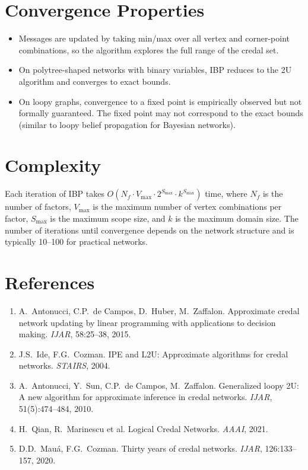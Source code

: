 \documentclass[11pt]{article}
\begin{document}
\section{Convergence Properties}

\begin{itemize}
  \item Messages are updated by taking min/max over all vertex and corner-point
        combinations, so the algorithm explores the full range of the credal set.
  \item On polytree-shaped networks with binary variables, IBP reduces to the
        2U algorithm and converges to exact bounds.
  \item On loopy graphs, convergence to a fixed point is empirically observed
        but not formally guaranteed. The fixed point may not correspond to the
        exact bounds (similar to loopy belief propagation for Bayesian networks).
\end{itemize}

\section{Complexity}

Each iteration of IBP takes $O(N_f \cdot V_{\max} \cdot 2^{S_{\max}} \cdot k^{S_{\max}})$
time, where $N_f$ is the number of factors, $V_{\max}$ is the maximum number of vertex
combinations per factor, $S_{\max}$ is the maximum scope size, and $k$ is the maximum
domain size. The number of iterations until convergence depends on the network structure
and is typically 10--100 for practical networks.

\section{References}

\begin{enumerate}
\item A.\ Antonucci, C.P.\ de Campos, D.\ Huber, M.\ Zaffalon. Approximate credal
      network updating by linear programming with applications to decision making.
      \emph{IJAR}, 58:25--38, 2015.
\item J.S.\ Ide, F.G.\ Cozman. IPE and L2U: Approximate algorithms for credal
      networks. \emph{STAIRS}, 2004.
\item A.\ Antonucci, Y.\ Sun, C.P.\ de Campos, M.\ Zaffalon. Generalized loopy 2U:
      A new algorithm for approximate inference in credal networks. \emph{IJAR},
      51(5):474--484, 2010.
\item H.\ Qian, R.\ Marinescu et al. Logical Credal Networks. \emph{AAAI}, 2021.
\item D.D.\ Mau\'a, F.G.\ Cozman. Thirty years of credal networks. \emph{IJAR},
      126:133--157, 2020.
\end{enumerate}
\end{document}
